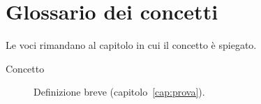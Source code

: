 \chapter{Glossario dei concetti}

Le voci rimandano al capitolo in cui il concetto è spiegato.

\begin{description}
\item[Concetto] Definizione breve (capitolo~\ref{cap:prova}).
\end{description}
